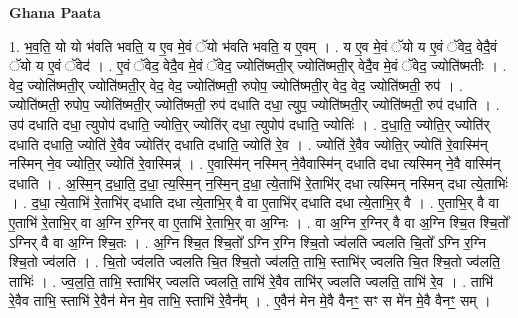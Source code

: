 \documentclass[17pt]{extarticle}
\begin{document}
\textbf{Ghana Paata } \newline

1. भ॒व॒ति॒ यो यो भ॑वति भवति॒ य ए॒व मे॒वं ॅयो भ॑वति भवति॒ य ए॒वम् । . य ए॒व मे॒वं ॅयो य ए॒वं ॅवेद॒ वेदै॒वं ॅयो य ए॒वं ॅवेद॑ । . ए॒वं ॅवेद॒ वेदै॒व मे॒वं ॅवेद॒ ज्योति॑ष्मती॒र् ज्योति॑ष्मती॒र् वेदै॒व मे॒वं ॅवेद॒ ज्योति॑ष्मतीः । . वेद॒ ज्योति॑ष्मती॒र् ज्योति॑ष्मती॒र् वेद॒ वेद॒ ज्योति॑ष्मती॒ रुपोप॒ ज्योति॑ष्मती॒र् वेद॒ वेद॒ ज्योति॑ष्मती॒ रुप॑ । . ज्योति॑ष्मती॒ रुपोप॒ ज्योति॑ष्मती॒र् ज्योति॑ष्मती॒ रुप॑ दधाति दधा॒ त्युप॒ ज्योति॑ष्मती॒र् ज्योति॑ष्मती॒ रुप॑ दधाति । . उप॑ दधाति दधा॒ त्युपोप॑ दधाति॒ ज्योति॒र् ज्योति॑र् दधा॒ त्युपोप॑ दधाति॒ ज्योतिः॑ । . द॒धा॒ति॒ ज्योति॒र् ज्योति॑र् दधाति दधाति॒ ज्योति॑ रे॒वैव ज्योति॑र् दधाति दधाति॒ ज्योति॑ रे॒व । . ज्योति॑ रे॒वैव ज्योति॒र् ज्योति॑ रे॒वास्मि॑न् नस्मिन् ने॒व ज्योति॒र् ज्योति॑ रे॒वास्मिन्न्॑ । . ए॒वास्मि॑न् नस्मिन् ने॒वैवास्मि॑न् दधाति दधा त्यस्मिन् ने॒वै वास्मि॑न् दधाति । . अ॒स्मि॒न् द॒धा॒ति॒ द॒धा॒ त्य॒स्मि॒न् न॒स्मि॒न् द॒धा॒ त्ये॒ताभि॑ रे॒ताभि॑र् दधा त्यस्मिन् नस्मिन् दधा त्ये॒ताभिः॑ । . द॒धा॒ त्ये॒ताभि॑ रे॒ताभि॑र् दधाति दधा त्ये॒ताभि॒र् वै वा ए॒ताभि॑र् दधाति दधा त्ये॒ताभि॒र् वै । . ए॒ताभि॒र् वै वा ए॒ताभि॑ रे॒ताभि॒र् वा अ॒ग्नि र॒ग्निर् वा ए॒ताभि॑ रे॒ताभि॒र् वा अ॒ग्निः । . वा अ॒ग्नि र॒ग्निर् वै वा अ॒ग्नि श्चि॒त श्चि॒तो᳚ ऽग्निर् वै वा अ॒ग्नि श्चि॒तः । . अ॒ग्नि श्चि॒त श्चि॒तो᳚ ऽग्नि र॒ग्नि श्चि॒तो ज्व॑लति ज्वलति चि॒तो᳚ ऽग्नि र॒ग्नि श्चि॒तो ज्व॑लति । . चि॒तो ज्व॑लति ज्वलति चि॒त श्चि॒तो ज्व॑लति॒ ताभि॒ स्ताभि॑र् ज्वलति चि॒त श्चि॒तो ज्व॑लति॒ ताभिः॑ । . ज्व॒ल॒ति॒ ताभि॒ स्ताभि॑र् ज्वलति ज्वलति॒ ताभि॑ रे॒वैव ताभि॑र् ज्वलति ज्वलति॒ ताभि॑ रे॒व । . ताभि॑ रे॒वैव ताभि॒ स्ताभि॑ रे॒वैन॑ मेन मे॒व ताभि॒ स्ताभि॑ रे॒वैन᳚म् । . ए॒वैन॑ मेन मे॒वै वैनꣳ॒॒ सꣳ स मे॑न मे॒वै वैनꣳ॒॒ सम् । \newline
\end{document}
